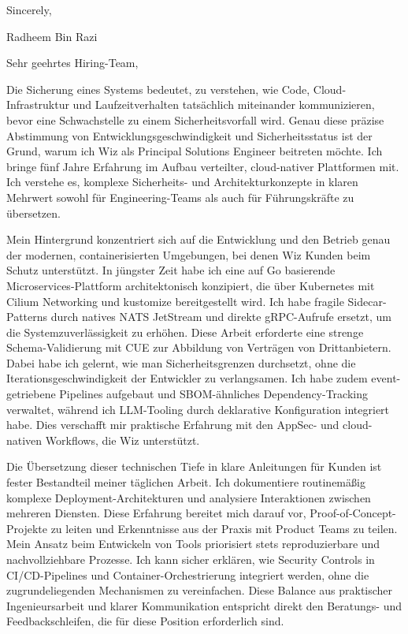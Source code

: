 \documentclass[11pt,a4paper]{coverletter}
\begin{document}
\closing{Sincerely,}{Radheem Bin Razi}

\clearpage
{}


\opening{Sehr geehrtes Hiring-Team,}

Die Sicherung eines Systems bedeutet, zu verstehen, wie Code, Cloud-Infrastruktur und Laufzeitverhalten tatsächlich miteinander kommunizieren, bevor eine Schwachstelle zu einem Sicherheitsvorfall wird. Genau diese präzise Abstimmung von Entwicklungsgeschwindigkeit und Sicherheitsstatus ist der Grund, warum ich Wiz als Principal Solutions Engineer beitreten möchte. Ich bringe fünf Jahre Erfahrung im Aufbau verteilter, cloud-nativer Plattformen mit. Ich verstehe es, komplexe Sicherheits- und Architekturkonzepte in klaren Mehrwert sowohl für Engineering-Teams als auch für Führungskräfte zu übersetzen.

Mein Hintergrund konzentriert sich auf die Entwicklung und den Betrieb genau der modernen, containerisierten Umgebungen, bei denen Wiz Kunden beim Schutz unterstützt. In jüngster Zeit habe ich eine auf Go basierende Microservices-Plattform architektonisch konzipiert, die über Kubernetes mit Cilium Networking und kustomize bereitgestellt wird. Ich habe fragile Sidecar-Patterns durch natives NATS JetStream und direkte gRPC-Aufrufe ersetzt, um die Systemzuverlässigkeit zu erhöhen. Diese Arbeit erforderte eine strenge Schema-Validierung mit CUE zur Abbildung von Verträgen von Drittanbietern. Dabei habe ich gelernt, wie man Sicherheitsgrenzen durchsetzt, ohne die Iterationsgeschwindigkeit der Entwickler zu verlangsamen. Ich habe zudem event-getriebene Pipelines aufgebaut und SBOM-ähnliches Dependency-Tracking verwaltet, während ich LLM-Tooling durch deklarative Konfiguration integriert habe. Dies verschafft mir praktische Erfahrung mit den AppSec- und cloud-nativen Workflows, die Wiz unterstützt.

Die Übersetzung dieser technischen Tiefe in klare Anleitungen für Kunden ist fester Bestandteil meiner täglichen Arbeit. Ich dokumentiere routinemäßig komplexe Deployment-Architekturen und analysiere Interaktionen zwischen mehreren Diensten. Diese Erfahrung bereitet mich darauf vor, Proof-of-Concept-Projekte zu leiten und Erkenntnisse aus der Praxis mit Product Teams zu teilen. Mein Ansatz beim Entwickeln von Tools priorisiert stets reproduzierbare und nachvollziehbare Prozesse. Ich kann sicher erklären, wie Security Controls in CI/CD-Pipelines und Container-Orchestrierung integriert werden, ohne die zugrundeliegenden Mechanismen zu vereinfachen. Diese Balance aus praktischer Ingenieursarbeit und klarer Kommunikation entspricht direkt den Beratungs- und Feedbackschleifen, die für diese Position erforderlich sind.
\end{document}
